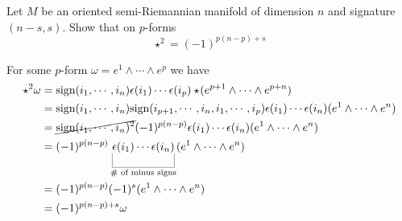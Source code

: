 \documentclass[10pt]{article}
\begin{document}
\begin{example}\label{b1e68}
	Let $M$ be an oriented semi-Riemannian manifold of dimension $n$ and signature $(n-s,s)$. Show that on $p$-forms
	$$
		\star^2 = (-1)^{p(n-p)+s}
	$$
\end{example}
\sol For some $p$-form $\omega = e^{1} \wedge \cdots \wedge e^{p}$ we have
$$
\begin{aligned}
	\star^2 \omega &= \sign(i_1, \cdots, i_n) \epsilon(i_1) \cdots \epsilon(i_p) \star\!(e^{p+1} \wedge \cdots \wedge e^{p+n})\\
	&= \sign(i_1, \cdots, i_n) \sign(i_{p+1}, \cdots, i_n, i_1, \cdots, i_p)\epsilon(i_1) \cdots \epsilon(i_n)  (e^{1} \wedge \cdots \wedge e^{n})\\
	&= \cancel{\sign(i_1, \cdots, i_n)^2} (-1)^{p(n-p)}\epsilon(i_1) \cdots \epsilon(i_n)  (e^{1} \wedge \cdots \wedge e^{n})\\
	&= (-1)^{p(n-p)} \ub{\epsilon(i_1) \cdots \epsilon(i_n)}{\# \text{ of minus signs}} (e^{1} \wedge \cdots \wedge e^{n})\\
	&= (-1)^{p(n-p)} (-1)^s (e^{1} \wedge \cdots \wedge e^{n})\\
	&= (-1)^{p(n-p)+s} \omega
\end{aligned}
$$
\end{document}
